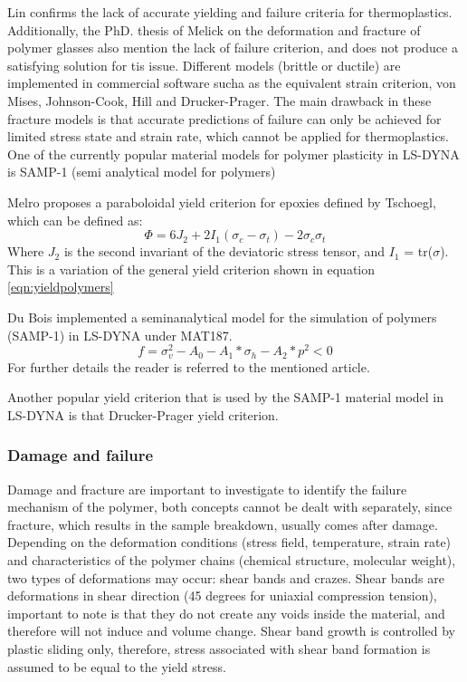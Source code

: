 Lin\cite{Lin2013StressLoading} confirms the lack of accurate yielding and failure criteria for thermoplastics. Additionally, the PhD. thesis of Melick \cite{Melick2002DeformationGlasses} on the deformation and fracture of polymer glasses also mention the lack of failure criterion, and does not produce a satisfying solution for tis issue. Different  models (brittle or ductile) are implemented in commercial software sucha as the equivalent strain criterion, von Mises, Johnson-Cook, Hill and Drucker-Prager. The main drawback in these fracture models is that accurate predictions of failure can only be achieved for limited stress state and strain rate, which cannot be applied for thermoplastics. One of the currently popular material models for polymer plasticity  in LS-DYNA is SAMP-1 (semi analytical model for polymers)

Melro \cite{Melro2013MicromechanicalModelling} proposes a paraboloidal yield criterion for epoxies defined by Tschoegl, which can be defined as:
\begin{equation}\label{eqn:Tschoegl}
\Phi=6J_2+2I_1(\sigma_c-\sigma_t)-2\sigma_c\sigma_t
\end{equation}Where $J_2$ is the second invariant of the deviatoric stress tensor, and $I_1$ = tr(\textbf{$\sigma$}). This is a variation of the general yield criterion shown in equation \ref{eqn:yieldpolymers}

Du Bois \cite{DuBois2006APolymers} implemented a seminanalytical model for the simulation of polymers (SAMP-1) in LS-DYNA under MAT187. 
\begin{equation}\label{AzziTsai}
f=\sigma_v^2-A_0-A_1*\sigma_h-A_2*p^2<0
\end{equation}For further details the reader is referred to the mentioned article. 

Another popular yield criterion that is used by the SAMP-1 material model in LS-DYNA is that Drucker-Prager yield criterion. 

\subsubsection{Damage and failure}
Damage and fracture are important to investigate to identify the failure mechanism of the polymer, both concepts cannot be dealt with separately, since fracture, which results in the sample breakdown, usually comes after damage. Depending on the deformation conditions (stress field, temperature, strain rate) and characteristics of the polymer chains (chemical structure, molecular weight), two types of deformations may occur: shear bands and crazes. Shear bands are deformations in shear direction (45 degrees for uniaxial compression tension), important to note is that they do not create any voids inside the material, and therefore will not induce and volume change. Shear band growth is controlled by plastic sliding only, therefore, stress associated with shear band formation is assumed to be equal to the yield stress. 


